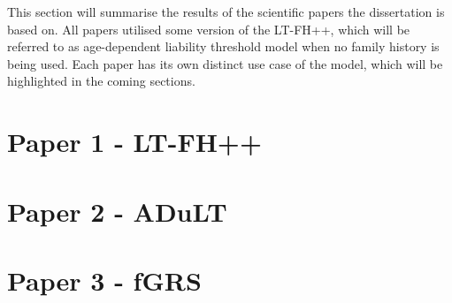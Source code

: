 


This section will summarise the results of the scientific papers the dissertation is based on. All papers utilised some version of the LT-FH++, which will be referred to as age-dependent liability threshold model when no family history is being used. Each paper has its own distinct use case of the model, which will be highlighted in the coming sections.

\section{Paper 1 - LT-FH++}

\newpage

\section{Paper 2 - ADuLT}

\newpage

\section{Paper 3 - fGRS}

\newpage



